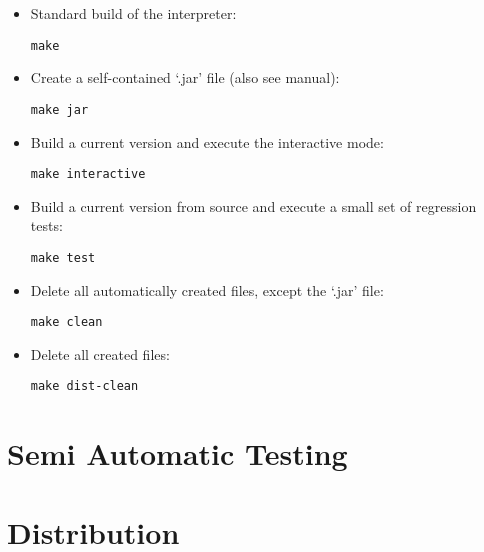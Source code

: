 \begin{itemize}
	\item Standard build of the interpreter:
\begin{lstlisting}[frame=none,numbers=none]
make
\end{lstlisting}

	\item Create a self-contained `.jar' file (also see manual):

\begin{lstlisting}[frame=none,numbers=none]
make jar
\end{lstlisting}

	\item Build a current version and execute the interactive mode:

\begin{lstlisting}[frame=none,numbers=none]
make interactive
\end{lstlisting}

	\item Build a current version from source and execute a small set of regression tests:

\begin{lstlisting}[frame=none,numbers=none]
make test
\end{lstlisting}

	\item Delete all automatically created files, except the `.jar' file:

\begin{lstlisting}[frame=none,numbers=none]
make clean
\end{lstlisting}

	\item Delete all created files:

\begin{lstlisting}[frame=none,numbers=none]
make dist-clean
\end{lstlisting}

\end{itemize}

\section{Semi Automatic Testing}


\section{Distribution}

